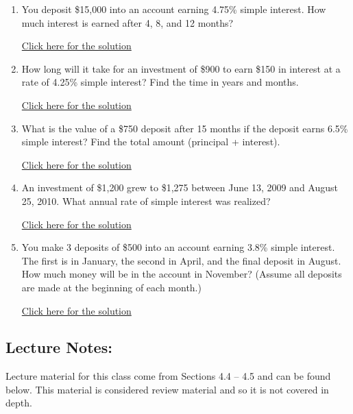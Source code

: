 \documentclass[
]{book}
\providecommand{\tightlist}{%
  \setlength{\itemsep}{0pt}\setlength{\parskip}{0pt}}
\begin{document}
\begin{enumerate}
\def\labelenumi{\arabic{enumi}.}
\tightlist
\item
  You deposit \$15,000 into an account earning 4.75\% simple interest. How much interest is earned after 4, 8, and 12 months?

  \href{https://youtu.be/HuDASjD4nMM}{Click here for the solution}
\item
  How long will it take for an investment of \$900 to earn \$150 in interest at a rate of 4.25\% simple interest? Find the time in years and months.

  \href{https://youtu.be/qlWcS-9gIA0}{Click here for the solution}
\item
  What is the value of a \$750 deposit after 15 months if the deposit earns 6.5\% simple interest? Find the total amount (principal + interest).

  \href{https://youtu.be/TbWUIo3dGTk}{Click here for the solution}
\item
  An investment of \$1,200 grew to \$1,275 between June 13, 2009 and August 25, 2010. What annual rate of simple interest was realized?

  \href{https://youtu.be/fTSXKSAGclc}{Click here for the solution}
\item
  You make 3 deposits of \$500 into an account earning 3.8\% simple interest. The first is in January, the second in April, and the final deposit in August. How much money will be in the account in November? (Assume all deposits are made at the beginning of each month.)

  \href{https://youtu.be/UOrxaQ4701U}{Click here for the solution}
\end{enumerate}

\subsection*{Lecture Notes:}\label{lecture-notes-7}

Lecture material for this class come from Sections 4.4 -- 4.5 and can be found below. This material is considered review material and so it is not covered in depth.
\end{document}
